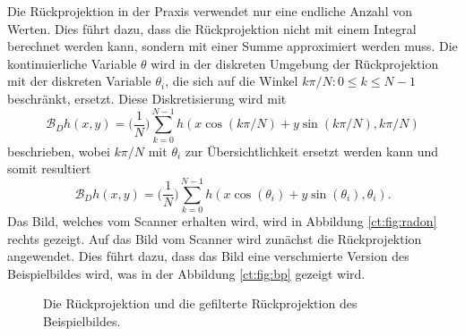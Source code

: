 Die Rückprojektion in der Praxis verwendet nur eine endliche Anzahl von Werten. Dies führt dazu, dass die Rückprojektion nicht mit einem Integral berechnet werden kann, sondern mit einer Summe approximiert werden muss. 
Die kontinuierliche Variable $\theta$ wird in der diskreten Umgebung der Rückprojektion mit der diskreten Variable $\theta_i$, die sich auf die Winkel ${k\pi/N: 0\le k \le N-1}$ beschränkt, ersetzt. Diese Diskretisierung wird mit 
\begin{equation}\label{ct:discreteBP}
		\mathscr{B}_Dh(x, y) = \biggl(\dfrac{1}{N}\biggr)\sum_{k=0}^{N-1} h(x\cos(k\pi/N)+y\sin(k\pi/N), k\pi/N)
\end{equation}
beschrieben, wobei $k\pi/N$ mit $\theta_i$ zur Übersichtlichkeit ersetzt werden kann und somit resultiert
\begin{equation}\label{ct:discreteBP_w_theta}
	\mathscr{B}_Dh(x, y) = \biggl(\dfrac{1}{N}\biggr)\sum_{k=0}^{N-1} h(x\cos(\theta_i)+y\sin(\theta_i), \theta_i).
\end{equation}
Das Bild, welches vom Scanner erhalten wird, wird in Abbildung \ref{ct:fig:radon} rechts gezeigt.
Auf das Bild vom Scanner wird zunächst die Rückprojektion angewendet. Dies führt dazu, dass das Bild eine \glqq verschmierte\grqq{} Version des Beispielbildes wird, was in der Abbildung \ref{ct:fig:bp} gezeigt wird.

\begin{figure}
	\centering
	\caption{Die Rückprojektion und die gefilterte Rückprojektion des Beispielbildes.}
\end{figure}

